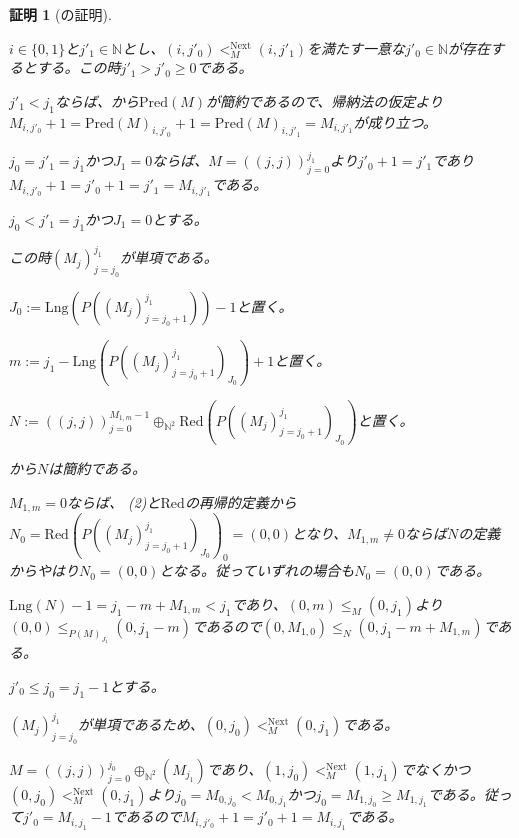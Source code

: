 \documentclass[dvipdfmx,uplatex]{jsarticle}
\theoremstyle{customnonumberbreakfortheorem}
\theoremstyle{customnonumberbreakforproof}
\newtheorem{hideableproof}{証明}
\begin{document}
\begin{hideableproof}[の証明]
\begin{indented}
\begin{indented}
\begin{indented}
\begin{indented}
					\item \(i \in \{0,1\}\)と\(j'_1 \in \mathbb{N}\)とし、\((i,j'_0) <_M^{\textrm{Next}} (i,j'_1)\)を満たす一意な\(j'_0 \in \mathbb{N}\)が存在するとする。この時\(j'_1 > j'_0 \geq 0\)である。
					\begin{indented}
						\item \(j'_1 < j_1\)ならば、から\(\textrm{Pred}(M)\)が簡約であるので、帰納法の仮定より\(M_{i,j'_0}+1 = \textrm{Pred}(M)_{i,j'_0}+1 = \textrm{Pred}(M)_{i,j'_1} = M_{i,j'_1}\)が成り立つ。
						\item \(j_0 = j'_1 = j_1\)かつ\(J_1 = 0\)ならば、\(M = ((j,j))_{j=0}^{j_1}\)より\(j'_0+1 = j'_1\)であり\(M_{i,j'_0}+1 = j'_0+1 = j'_1 = M_{i,j'_1}\)である。
						\item \(j_0 < j'_1 = j_1\)かつ\(J_1 = 0\)とする。
						\begin{indented}
							\item この時\((M_j)_{j=j_0}^{j_1}\)が単項である。
							\item \(J_0 := \textrm{Lng}(P((M_j)_{j=j_0+1}^{j_1}))-1\)と置く。
							\item \(m := j_1 - \textrm{Lng}(P((M_j)_{j=j_0+1}^{j_1})_{J_0}) + 1\)と置く。
							\item \(N := ((j,j))_{j=0}^{M_{1,m}-1} \oplus_{\mathbb{N}^2} \textrm{Red}(P((M_j)_{j=j_0+1}^{j_1})_{J_0})\)と置く。
							\item {}から\(N\)は簡約である。
							\item \(M_{1,m}=0\)ならば、 (2)と\(\textrm{Red}\)の再帰的定義から\(N_0 = \textrm{Red}(P((M_j)_{j=j_0+1}^{j_1})_{J_0})_0 = (0,0)\)となり、\(M_{1,m} \neq 0\)ならば\(N\)の定義からやはり\(N_0 = (0,0)\)となる。従っていずれの場合も\(N_0 = (0,0)\)である。
							\item \(\textrm{Lng}(N) - 1 = j_1 - m + M_{1,m} < j_1\)であり、\((0,m) \leq_M (0,j_1)\)より\((0,0) \leq_{P(M)_{J_1}} (0,j_1-m)\)であるので\((0,M_{1,0}) \leq_N (0,j_1-m+M_{1,m})\)である。
							\item \(j'_0 \leq j_0 = j_1 - 1\)とする。
							\begin{indented}
								\item \((M_j)_{j=j_0}^{j_1}\)が単項であるため、\((0,j_0) <_M^{\textrm{Next}} (0,j_1)\)である。
								\item \(M = ((j,j))_{j=0}^{j_0} \oplus_{\mathbb{N}^2} (M_{j_1})\)であり、\((1,j_0) <_M^{\textrm{Next}} (1,j_1)\)でなくかつ\((0,j_0) <_M^{\textrm{Next}} (0,j_1)\)より\(j_0 = M_{0,j_0} < M_{0,j_1}\)かつ\(j_0 = M_{1,j_0} \geq M_{1,j_1}\)である。従って\(j'_0 = M_{i,j_1}-1\)であるので\(M_{i,j'_0}+1 = j'_0+1 = M_{i,j_1}\)である。

\end{indented}
\end{indented}
\end{indented}
\end{indented}
\end{indented}
\end{indented}
\end{indented}
\end{hideableproof}
\end{document}
